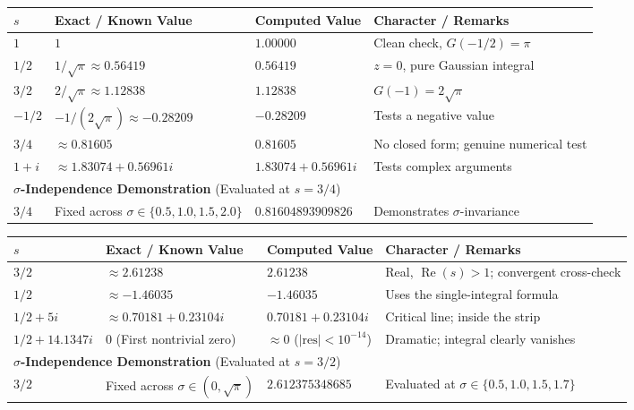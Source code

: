 \documentclass[12pt,english]{article}
\theoremstyle{plain} %
\theoremstyle{remark} %
\begin{document}
\begin{center}
\begin{small}
\begin{tabular*}{\textwidth}{@{\extracolsep{\fill}}llll@{ }}
        \toprule
        $s$ & Exact / Known Value & Computed Value & Character / Remarks \\
        \midrule
        $1$ & $1$ & $1.00000$ & Clean check, $G(-1/2) = {\pi}$ \\
        $1/2$ & $1/\sqrt{\pi} \approx 0.56419$ & $0.56419$ & $z=0$, pure Gaussian integral \\
        $3/2$ & $2/\sqrt{\pi} \approx 1.12838$ & $1.12838$ & $G(-1) = 2\sqrt{\pi}$ \\
        $-1/2$ & $-1/(2\sqrt{\pi}) \approx -0.28209$ & $-0.28209$ & Tests a negative value \\
        $3/4$ & $\approx 0.81605$ & $0.81605$ & No closed form; genuine numerical test \\
        $1 + i$ & $\approx 1.83074 + 0.56961i$ & $1.83074 + 0.56961i$ & Tests complex arguments \\
        \midrule
        \multicolumn{4}{l}{\textbf{$\sigma$-Independence Demonstration} (Evaluated at $s=3/4$)} \\
        \midrule
        $3/4$ & Fixed across $\sigma \in \{0.5, 1.0, 1.5, 2.0\}$ & $0.81604893909826$ & Demonstrates $\sigma$-invariance \\
        \bottomrule
        \end{tabular*}

\begin{tabular*}{\textwidth}{@{\extracolsep{\fill}}llll@{ }}
        \toprule
        $s$ & Exact / Known Value & Computed Value & Character / Remarks \\
        \midrule
        $3/2$ & $\approx 2.61238$ & $2.61238$ & Real, $\operatorname{Re}(s)>1$; convergent cross-check \\
        $1/2$ & $\approx -1.46035$ & $-1.46035$ & Uses the single-integral formula \\
        $1/2 + 5i$ & $\approx 0.70181 + 0.23104i$ & $0.70181 + 0.23104i$ & Critical line; inside the strip \\
        $1/2 + 14.1347i$ & $0$ (First nontrivial zero) & $\approx 0$ ($| \text{res} | < 10^{-14}$) & Dramatic; integral clearly vanishes \\
        \midrule
        \multicolumn{4}{l}{\textbf{$\sigma$-Independence Demonstration} (Evaluated at $s=3/2$)} \\
        \midrule
        $3/2$ & Fixed across $\sigma \in (0, \sqrt{\pi})$ & $2.612375348685$ & Evaluated at $\sigma \in \{0.5, 1.0, 1.5, 1.7\}$ \\
        \bottomrule
    \end{tabular*}
\end{small}
\end{center}
\end{document}
